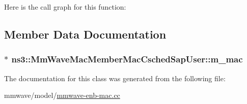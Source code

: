 Here is the call graph for this function\+:




\subsection{Member Data Documentation}
\subsubsection[{\texorpdfstring{m\+\_\+mac}{m_mac}}]{$\ast$ ns3\+::\+Mm\+Wave\+Mac\+Member\+Mac\+Csched\+Sap\+User\+::m\+\_\+mac\hspace{0.3cm}{\ttfamily [private]}}\hypertarget{classns3_1_1MmWaveMacMemberMacCschedSapUser_a7c30720347c7eb94fbfcff80ff76abf5}{}\label{classns3_1_1MmWaveMacMemberMacCschedSapUser_a7c30720347c7eb94fbfcff80ff76abf5}


The documentation for this class was generated from the following file\+:\begin{DoxyCompactItemize}
\item 
mmwave/model/\hyperlink{mmwave-enb-mac_8cc}{mmwave-\/enb-\/mac.\+cc}\end{DoxyCompactItemize}
